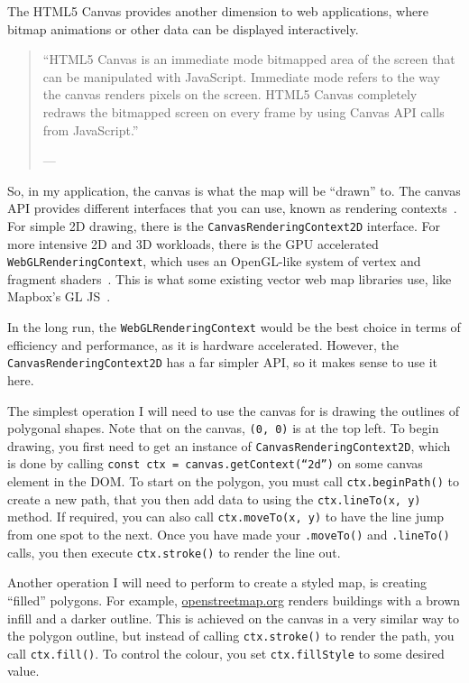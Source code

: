The HTML5 Canvas provides another dimension to web applications, where bitmap animations or other data can be displayed interactively.

\begin{quote}
    ``HTML5 Canvas is an immediate mode bitmapped area of the screen that can be manipulated with JavaScript. Immediate mode refers to the way the canvas renders pixels on the screen. HTML5 Canvas completely redraws the bitmapped screen on every frame by using Canvas API calls from JavaScript.''

    \footnotesize{--- }
\end{quote}

So, in my application, the canvas is what the map will be ``drawn'' to. The canvas API provides different interfaces that you can use, known as rendering contexts~\cite{mdn-canvas-api}. For simple 2D drawing, there is the \texttt{CanvasRenderingContext2D} interface. For more intensive 2D and 3D workloads, there is the GPU accelerated \texttt{WebGLRenderingContext}, which uses an OpenGL-like system of vertex and fragment shaders~\cite{mdn-web-gl}. This is what some existing vector web map libraries use, like Mapbox's GL JS~\cite{mapbox-gl-js}.

In the long run, the \texttt{WebGLRenderingContext} would be the best choice in terms of efficiency and performance, as it is hardware accelerated. However, the \texttt{Canvas\-Rendering\-Context2D} has a far simpler API, so it makes sense to use it here.

The simplest operation I will need to use the canvas for is drawing the outlines of polygonal shapes. Note that on the canvas, \texttt{(0, 0)} is at the top left. To begin drawing, you first need to get an instance of \texttt{Canvas\-Rendering\-Context2D}, which is done by calling \texttt{const ctx = canvas.getContext(``2d'')} on some canvas element in the DOM\@. To start on the polygon, you must call \texttt{ctx.beginPath()} to create a new path, that you then add data to using the \texttt{ctx.lineTo(x, y)} method. If required, you can also call \texttt{ctx.moveTo(x, y)} to have the line jump from one spot to the next. Once you have made your \texttt{.moveTo()} and \texttt{.lineTo()} calls, you then execute \texttt{ctx.stroke()} to render the line out.

Another operation I will need to perform to create a styled map, is creating ``filled'' polygons. For example, \href{https://openstreetmap.org}{openstreetmap.org} renders buildings with a brown infill and a darker outline. This is achieved on the canvas in a very similar way to the polygon outline, but instead of calling \texttt{ctx.stroke()} to render the path, you call \texttt{ctx.fill()}. To control the colour, you set \texttt{ctx.fillStyle} to some desired value.

